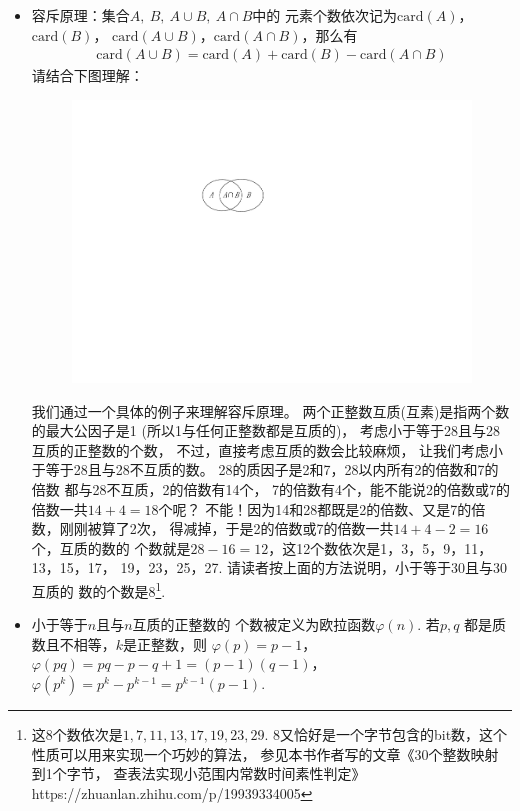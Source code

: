 \begin{itemize}[leftmargin=\inteval{\myitemleftmargin}pt,itemsep=
   \inteval{\myitemitempsep}pt,topsep=\inteval{\myitemtopsep}pt]
\item 容斥原理：集合$A,\ B,\ A\cup B,\ A\cap B$中的
元素个数依次记为$ \mathrm{card}(A) $，$\mathrm{card}(B) $，
$\mathrm{card}(A\cup B)$，$\mathrm{card}(A\cap B) $，那么有
\begin{gather}\label{容斥原理公式}
    \mathrm{card}(A\cup B)=\mathrm{card}(A)+\mathrm{card}(B) 
    -\mathrm{card}(A\cap B)
\end{gather}
请结合下图理解：
\begin{figure}[H]
    \centering
    \includegraphics[width=0.3\linewidth]{PDF_Picture/韦恩图-交集}
\end{figure}
我们通过一个具体的例子来理解容斥原理。
两个正整数互质(互素)是指两个数的最大公因子是1
(所以1与任何正整数都是互质的)，
考虑小于等于28且与28互质的正整数的个数，
不过，直接考虑互质的数会比较麻烦，
让我们考虑小于等于28且与28不互质的数。
28的质因子是2和7，28以内所有2的倍数和7的倍数
都与28不互质，2的倍数有14个，
7的倍数有4个，能不能说2的倍数或7的倍数一共$ 14+4=18 $个呢？
不能！因为14和28都既是2的倍数、又是7的倍数，刚刚被算了2次，
得减掉，于是2的倍数或7的倍数一共$ 14+4-2=16 $个，互质的数的
个数就是$ 28-16=12 $，这12个数依次是1，3，5，9，11，13，15，17，
19，23，25，27. 请读者按上面的方法说明，小于等于30且与30互质的
数的个数是8\footnote{这8个数依次是$ 1,7,11,13,17,19,23,29 $.\q 
    8又恰好是一个字节包含的bit数，这个性质可以用来实现一个巧妙的算法，
    参见本书作者写的文章《30个整数映射到1个字节，
    查表法实现小范围内常数时间素性判定》\\
    https://zhuanlan.zhihu.com/p/19939334005 }.

\item 小于等于$ n $且与$ n $互质的正整数的
个数被定义为欧拉函数$ \varphi(n) $. 
若$ p,q $ 都是质数且不相等，$ k $是正整数，则
$ \varphi(p)=p-1 $，$ \varphi(pq)=pq-p-q+1=(p-1)(q-1) $，
$ \varphi(p^k)=p^k-p^{k-1}=p^{k-1}(p-1) $.


\end{itemize}
